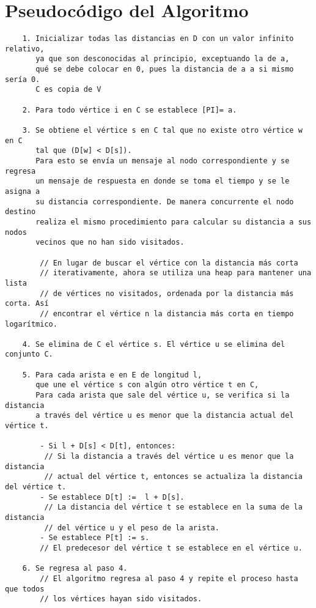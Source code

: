 \documentclass[a4paper,12pt]{article}
\begin{document}
\section*{Pseudocódigo del Algoritmo}
\begin{verbatim}
    1. Inicializar todas las distancias en D con un valor infinito relativo, 
       ya que son desconocidas al principio, exceptuando la de a, 
       qué se debe colocar en 0, pues la distancia de a a si mismo sería 0. 
       C es copia de V        
    
    2. Para todo vértice i en C se establece [PI]= a.        
    
    3. Se obtiene el vértice s en C tal que no existe otro vértice w en C 
       tal que (D[w] < D[s]). 
       Para esto se envía un mensaje al nodo correspondiente y se regresa
       un mensaje de respuesta en donde se toma el tiempo y se le asigna a 
       su distancia correspondiente. De manera concurrente el nodo destino 
       realiza el mismo procedimiento para calcular su distancia a sus nodos
       vecinos que no han sido visitados.
    
        // En lugar de buscar el vértice con la distancia más corta 
        // iterativamente, ahora se utiliza una heap para mantener una lista 
        // de vértices no visitados, ordenada por la distancia más corta. Así 
        // encontrar el vértice n la distancia más corta en tiempo logarítmico.    
    
    4. Se elimina de C el vértice s. El vértice u se elimina del conjunto C.
    
    5. Para cada arista e en E de longitud l, 
       que une el vértice s con algún otro vértice t en C,
       Para cada arista que sale del vértice u, se verifica si la distancia 
       a través del vértice u es menor que la distancia actual del vértice t.
    
        - Si l + D[s] < D[t], entonces:
         // Si la distancia a través del vértice u es menor que la distancia 
         // actual del vértice t, entonces se actualiza la distancia del vértice t.
        - Se establece D[t] :=  l + D[s].
         // La distancia del vértice t se establece en la suma de la distancia 
         // del vértice u y el peso de la arista.
        - Se establece P[t] := s.
        // El predecesor del vértice t se establece en el vértice u.
    
    6. Se regresa al paso 4.
        // El algoritmo regresa al paso 4 y repite el proceso hasta que todos
        // los vértices hayan sido visitados.    
\end{verbatim}
    
\end{document}
